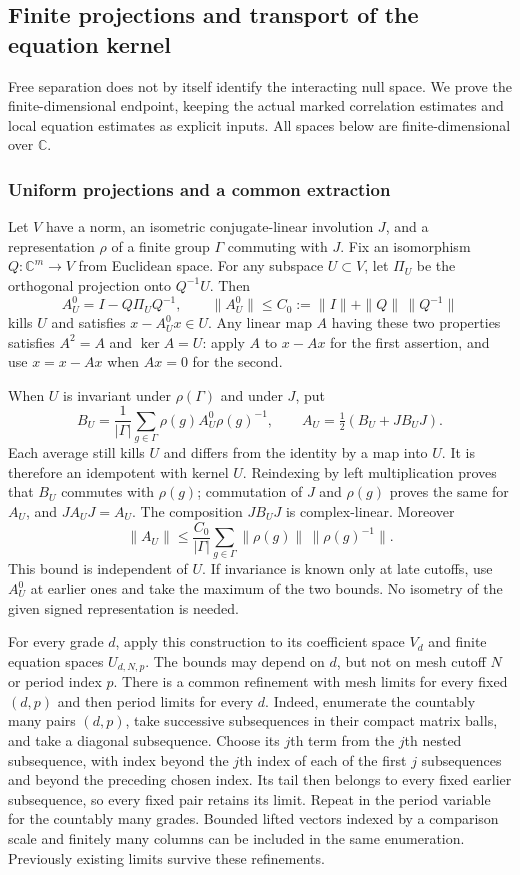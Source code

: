 \subsection{Finite projections and transport of the equation kernel}
\label{sec:finite-rank-kernel-transport}

Free separation does not by itself identify the interacting null space.
We prove the finite-dimensional endpoint, keeping the actual marked
correlation estimates and local equation estimates as explicit inputs.
All spaces below are finite-dimensional over $\mathbb C$.

\subsubsection{Uniform projections and a common extraction}

Let $V$ have a norm, an isometric conjugate-linear involution $J$, and a
representation $\rho$ of a finite group $\Gamma$ commuting with $J$.
Fix an isomorphism $Q:\mathbb C^m\to V$ from Euclidean space. For any
subspace $U\subset V$, let $\Pi_U$ be the orthogonal projection onto
$Q^{-1}U$. Then
\[
 A_U^0=I-Q\Pi_UQ^{-1},\qquad
 \|A_U^0\|\le C_0:=\|I\|+\|Q\|\,\|Q^{-1}\|
\]
kills $U$ and satisfies $x-A_U^0x\in U$. Any linear map $A$ having
these two properties satisfies $A^2=A$ and $\ker A=U$: apply $A$ to
$x-Ax$ for the first assertion, and use $x=x-Ax$ when $Ax=0$ for
the second.

When $U$ is invariant under $\rho(\Gamma)$ and under $J$, put
\[
 B_U=\frac1{|\Gamma|}\sum_{g\in\Gamma}\rho(g)A_U^0\rho(g)^{-1},
 \qquad A_U=\tfrac12(B_U+JB_UJ).
\]
Each average still kills $U$ and differs from the identity by a map
into $U$. It is therefore an idempotent with kernel $U$. Reindexing
by left multiplication proves that $B_U$ commutes with $\rho(g)$;
commutation of $J$ and $\rho(g)$ proves the same for $A_U$, and
$JA_UJ=A_U$. The composition $JB_UJ$ is complex-linear. Moreover
\[
 \|A_U\|\le\frac{C_0}{|\Gamma|}
       \sum_{g\in\Gamma}\|\rho(g)\|\,\|\rho(g)^{-1}\|.
\]
This bound is independent of $U$. If invariance is known only at late
cutoffs, use $A_U^0$ at earlier ones and take the maximum of the two
bounds. No isometry of the given signed representation is needed.

For every grade $d$, apply this construction to its coefficient space
$V_d$ and finite equation spaces $U_{d,N,p}$. The bounds may depend
on $d$, but not on mesh cutoff $N$ or period index $p$. There is a
common refinement with mesh limits for every fixed $(d,p)$ and then
period limits for every $d$. Indeed, enumerate the countably many
pairs $(d,p)$, take successive subsequences in their compact matrix
balls, and take a diagonal subsequence. Choose its $j$th term from the $j$th nested subsequence,
with index beyond the $j$th index of each of the first $j$ subsequences
and beyond the preceding chosen index. Its tail then belongs to every
fixed earlier subsequence, so every fixed pair retains its limit. Repeat in the period variable for the
countably many grades. Bounded lifted vectors indexed by a comparison
scale and finitely many columns can be included in the same enumeration.
Previously existing limits survive these refinements.


